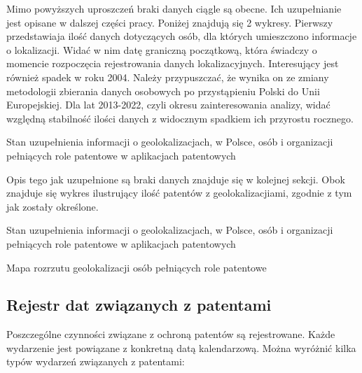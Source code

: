 \begin{multicols}{2}
Mimo powyższych uproszczeń braki danych ciągle są obecne. Ich uzupełnianie
jest opisane w dalszej części pracy. Poniżej znajdują się 2 wykresy. 
Pierwszy przedstawiaja ilość danych dotyczących osób, dla których 
umieszczono informacje o lokalizacji. Widać w nim datę graniczną początkową,
która świadczy o momencie rozpoczęcia rejestrowania danych lokalizacyjnych.
Interesujący jest również spadek w roku 2004. Należy przypuszczać, że wynika
on ze zmiany metodologii zbierania danych osobowych po przystąpieniu
Polski do Unii Europejskiej.
Dla lat 2013-2022, czyli okresu zainteresowania analizy,
widać względną stabilność ilości danych z widocznym
spadkiem ich przyrostu rocznego. 

\columnbreak
{}
{ Stan uzupełnienia informacji
  o geolokalizacjach,
  w Polsce,
  osób i organizacji 
  pełniących role patentowe 
  w aplikacjach patentowych}

\end{multicols}


\newpage
\begin{multicols}{2}

Opis tego jak uzupełnione są braki danych znajduje się w kolejnej sekcji.
Obok znajduje się wykres ilustrujący ilość patentów z geolokalizacjiami,
zgodnie z tym jak zostały określone.

{ Stan uzupełnienia informacji o geolokalizacjach, w Polsce, 
  osób i organizacji  pełniących role patentowe
  w aplikacjach patentowych}

{Mapa rozrzutu geolokalizacji osób pełniących role patentowe}

\end{multicols}




\subsection{Rejestr dat związanych z patentami}

Poszczególne czynności związane z ochroną patentów są rejestrowane.
Każde wydarzenie jest powiązane z konkretną datą kalendarzową.
Można wyróżnić kilka typów wydarzeń związanych z patentami:

